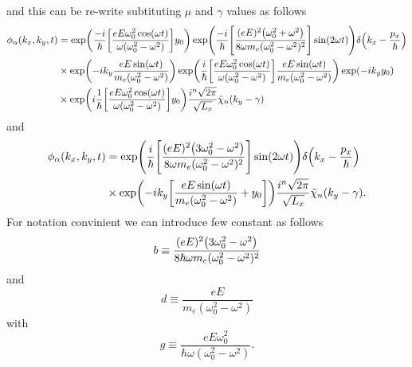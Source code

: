 and this can be re-write subtituting $\mu$ and $\gamma$ values as follows
\begin{equation} \label{3.35}
  \begin{aligned}
    \phi_{\alpha}(k_x,k_y,t) & =
    \exp(
      \frac{-i}{\hbar}
      \qty[
      \frac{eE\omega_0^2\cos(\omega t)}{\omega(\omega_0^2 - \omega^2)}]y_0
    )
    \exp(
      \frac{-i}{\hbar}
      \qty[
      \frac{(eE)^2\qty(\omega_0^2 + \omega^2)}{8\omega m_e(\omega_0^2 - \omega^2)^2}
      ]\sin(2\omega t)
    )
    \delta\qty(k_x -\frac{p_x}{\hbar})\\
    & \times
    \exp(
      -ik_y  \frac{eE\sin(\omega t)}{m_e(\omega_0^2 - \omega^2)}
    )
    \exp(
      \frac{i}{\hbar}
      \qty[ \frac{eE\omega_0^2\cos(\omega t)}{\omega(\omega_0^2 - \omega^2)}]
      \frac{eE\sin(\omega t)}{m_e(\omega_0^2 - \omega^2)}
    )
    \exp(
      -i k_y y_0
    ) \\
    & \times
    \exp(
      i \frac{1}{\hbar}
      \qty[ \frac{eE\omega_0^2\cos(\omega t)}{\omega(\omega_0^2 - \omega^2)}]
      y_0
    )
    \frac{i^n\sqrt{2\pi}}{\sqrt{L_x}}
    \tilde{\chi}_{n}\qty(k_y -\gamma)
  \end{aligned}
\end{equation}
and
\begin{equation} \label{3.36}
  \begin{aligned}
    \phi_{\alpha}(k_x,k_y,t) & =
    \exp(
      \frac{i}{\hbar}
      \qty[
      \frac{(eE)^2\qty(3\omega_0^2 - \omega^2)}{8\omega m_e(\omega_0^2 - \omega^2)^2}
      ]\sin(2\omega t)
    )
    \delta\qty(k_x -\frac{p_x}{\hbar})\\
    & \times
    \exp(
      -ik_y  \qty[\frac{eE\sin(\omega t)}{m_e(\omega_0^2 - \omega^2)} + y_0]
    )
    \frac{i^n\sqrt{2\pi}}{\sqrt{L_x}}
    \tilde{\chi}_{n}\qty(k_y -\gamma).
  \end{aligned}
\end{equation}
For notation convinient we can introduce few constant as follows
\begin{equation} \label{3.37}
  b \equiv
  \frac{(eE)^2\qty(3\omega_0^2 - \omega^2)}{8\hbar \omega m_e(\omega_0^2 - \omega^2)^2}
\end{equation}
and
\begin{equation} \label{3.38}
  d \equiv
  \frac{eE}{m_e(\omega_0^2 - \omega^2)}
\end{equation}
with
\begin{equation} \label{3.39}
  g \equiv
  \frac{eE\omega_0^2}{\hbar\omega(\omega_0^2 - \omega^2)}.
\end{equation}
